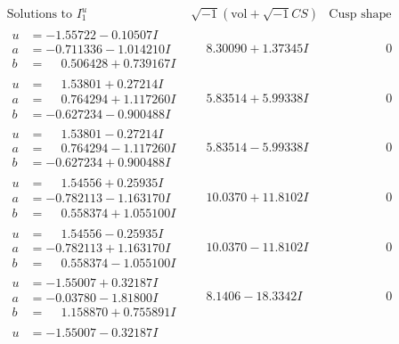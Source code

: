 \documentclass[1p]{elsarticle_modified}
\theoremstyle{definition}
\newcommand{\I}{\sqrt{-1}}
\begin{document}
$$\begin{array}{c|c|c}
\text{Solutions to }I^u_{1}& \I (\text{vol} + \sqrt{-1}CS) & \text{Cusp shape}\\
 \hline 
\begin{aligned}
u &= -1.55722 - 0.10507 I \\
a &= -0.711336 - 1.014210 I \\
b &= \phantom{-}0.506428 + 0.739167 I\end{aligned}
 & \phantom{-}8.30090 + 1.37345 I & \phantom{-0.000000 } 0 \\ \hline\begin{aligned}
u &= \phantom{-}1.53801 + 0.27214 I \\
a &= \phantom{-}0.764294 + 1.117260 I \\
b &= -0.627234 - 0.900488 I\end{aligned}
 & \phantom{-}5.83514 + 5.99338 I & \phantom{-0.000000 } 0 \\ \hline\begin{aligned}
u &= \phantom{-}1.53801 - 0.27214 I \\
a &= \phantom{-}0.764294 - 1.117260 I \\
b &= -0.627234 + 0.900488 I\end{aligned}
 & \phantom{-}5.83514 - 5.99338 I & \phantom{-0.000000 } 0 \\ \hline\begin{aligned}
u &= \phantom{-}1.54556 + 0.25935 I \\
a &= -0.782113 - 1.163170 I \\
b &= \phantom{-}0.558374 + 1.055100 I\end{aligned}
 & \phantom{-}10.0370 + 11.8102 I & \phantom{-0.000000 } 0 \\ \hline\begin{aligned}
u &= \phantom{-}1.54556 - 0.25935 I \\
a &= -0.782113 + 1.163170 I \\
b &= \phantom{-}0.558374 - 1.055100 I\end{aligned}
 & \phantom{-}10.0370 - 11.8102 I & \phantom{-0.000000 } 0 \\ \hline\begin{aligned}
u &= -1.55007 + 0.32187 I \\
a &= -0.03780 - 1.81800 I \\
b &= \phantom{-}1.158870 + 0.755891 I\end{aligned}
 & \phantom{-}8.1406 - 18.3342 I & \phantom{-0.000000 } 0 \\ \hline\begin{aligned}
u &= -1.55007 - 0.32187 I \\

\end{aligned}
\end{array}$$
\end{document}
